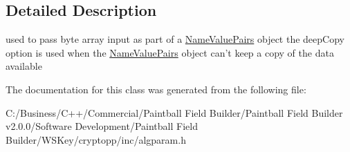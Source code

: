 \subsection{Detailed Description}
used to pass byte array input as part of a \hyperlink{class_name_value_pairs}{NameValuePairs} object the deepCopy option is used when the \hyperlink{class_name_value_pairs}{NameValuePairs} object can't keep a copy of the data available 

The documentation for this class was generated from the following file:\begin{DoxyCompactItemize}
\item 
C:/Business/C++/Commercial/Paintball Field Builder/Paintball Field Builder v2.0.0/Software Development/Paintball Field Builder/WSKey/cryptopp/inc/algparam.h\end{DoxyCompactItemize}
